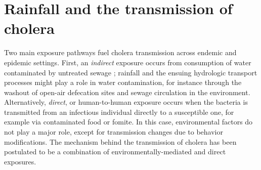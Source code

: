 \section{Rainfall and the transmission of cholera}\label{sec:rainfall-cholera-transmission}
Two main exposure pathways fuel cholera transmission across endemic and epidemic settings.
First, an \textit{indirect} exposure occurs from consumption of water contaminated by untreated sewage%
; rainfall and the ensuing hydrologic transport processes might play a role in water contamination, for instance through the washout of open-air defecation sites and sewage circulation in the environment.
Alternatively, \textit{direct}, or human-to-human exposure occurs when the bacteria is transmitted from an infectious individual directly to a susceptible one, for example via contaminated food or fomite. In this case, environmental factors do not play a major role, except for transmission changes due to behavior modifications.
The mechanism behind the transmission of cholera has been postulated to be a combination of environmentally-mediated and direct exposures.
